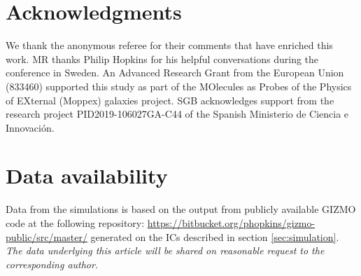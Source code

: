 \documentclass[fleqn,usenatbib]{mnras}
\begin{document}
\section*{Acknowledgments} \label{sec:acknow}
  We thank the anonymous referee for their comments that have enriched this work. MR thanks Philip Hopkins for his helpful conversations during the conference in Sweden. An Advanced Research Grant from the European Union (833460) supported this study as part of the  MOlecules as Probes of the Physics of EXternal (Moppex) galaxies project. SGB acknowledges support from the research project PID2019-106027GA-C44 of the Spanish Ministerio de Ciencia e Innovaci\'on.

\section*{Data availability}
Data from the simulations is based on the output from publicly available GIZMO \citep{Hopkins2015} code at the following repository: \href{https://bitbucket.org/phopkins/gizmo-public/src/master/}{https://bitbucket.org/phopkins/gizmo-public/src/master/}  generated on the ICs described in section \ref{sec:simulation}. \textit{The data underlying this article will be shared on reasonable request to the corresponding author}.

\appendix




\label{lastpage}
\end{document}
